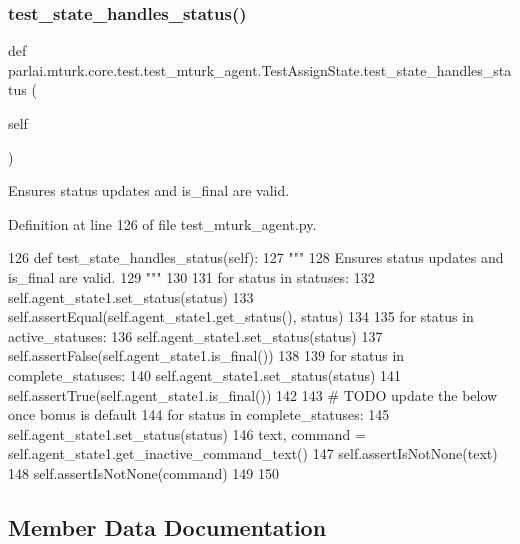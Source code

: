 \subsubsection{\texorpdfstring{test\+\_\+state\+\_\+handles\+\_\+status()}{test\_state\_handles\_status()}}
{\footnotesize\ttfamily def parlai.\+mturk.\+core.\+test.\+test\+\_\+mturk\+\_\+agent.\+Test\+Assign\+State.\+test\+\_\+state\+\_\+handles\+\_\+status (\begin{DoxyParamCaption}\item[{}]{self }\end{DoxyParamCaption})}

\begin{DoxyVerb}Ensures status updates and is_final are valid.
\end{DoxyVerb}
 

Definition at line 126 of file test\+\_\+mturk\+\_\+agent.\+py.


\begin{DoxyCode}
126     \textcolor{keyword}{def }test\_state\_handles\_status(self):
127         \textcolor{stringliteral}{"""}
128 \textcolor{stringliteral}{        Ensures status updates and is\_final are valid.}
129 \textcolor{stringliteral}{        """}
130 
131         \textcolor{keywordflow}{for} status \textcolor{keywordflow}{in} statuses:
132             self.agent\_state1.set\_status(status)
133             self.assertEqual(self.agent\_state1.get\_status(), status)
134 
135         \textcolor{keywordflow}{for} status \textcolor{keywordflow}{in} active\_statuses:
136             self.agent\_state1.set\_status(status)
137             self.assertFalse(self.agent\_state1.is\_final())
138 
139         \textcolor{keywordflow}{for} status \textcolor{keywordflow}{in} complete\_statuses:
140             self.agent\_state1.set\_status(status)
141             self.assertTrue(self.agent\_state1.is\_final())
142 
143         \textcolor{comment}{# TODO update the below once bonus is default}
144         \textcolor{keywordflow}{for} status \textcolor{keywordflow}{in} complete\_statuses:
145             self.agent\_state1.set\_status(status)
146             text, command = self.agent\_state1.get\_inactive\_command\_text()
147             self.assertIsNotNone(text)
148             self.assertIsNotNone(command)
149 
150 
\end{DoxyCode}


\subsection{Member Data Documentation}
\mbox{\label{classparlai_1_1mturk_1_1core_1_1test_1_1test__mturk__agent_1_1TestAssignState_a6f2c7861fec97ff6acf347d59e3edd33}} 
